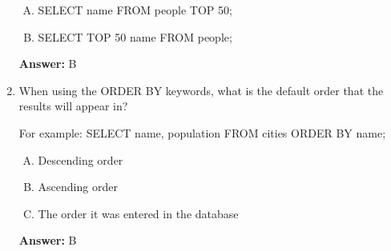 \documentclass[12pt]{article}
\begin{document}
\begin{enumerate}[1.]
    \bigskip

    \begin{enumerate}[A.]
        \item SELECT name FROM people TOP 50;
        \item SELECT TOP 50 name FROM people;
    \end{enumerate}

    \textbf{Answer:} B

    \item

    When using the ORDER BY keywords, what is the default order that the results
    will appear in?

    \bigskip

    For example: SELECT name, population FROM cities ORDER BY name;

    \bigskip

    \begin{enumerate}[A.]
        \item Descending order
        \item Ascending order
        \item The order it was entered in the database
    \end{enumerate}

    \textbf{Answer:} B

\end{enumerate}
\end{document}
